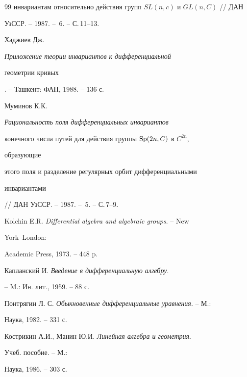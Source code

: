 \begin{thebibliography}{99}
{инвариантам относительно действия групп $SL(n,c)$ и $GL(n,C)$} // ДАН 


УзССР. -- 1987. -- \No\,6. -- С.\,11--13.




Хаджиев Дж. {\em Приложение теории инвариантов к дифференциальной 


геометрии кривых}. -- Ташкент: ФАН, 1988. -- 136 с.




Муминов К.К. {\em Рациональность поля дифференциальных инвариантов 


конечного числа путей для действия группы $\operatorname{Sp}(2n,C)$ в $C^{2n}$, 


образующие 


этого поля и разделение регулярных орбит дифференциальными 


инвариантами} // ДАН УзССР. -- 1987. -- \No\,5. -- С.\,7--9.




Kolchin E.R. {\em Differential algebra and algebraic groups}. -- New 


York--London:


Academic Press, 1973. -- 448 p.




Капланский И. {\em Введение в дифференциальную алгебру}.


-- M.: Ин. лит., 1959. -- 88 с.




Понтрягин Л. С. {\em Обыкновенные дифференциальные уравнения}. -- М.:


Наука, 1982. -- 331 с.




Кострикин А.И., Манин Ю.И. {\em Линейная алгебра и геометрия}.


Учеб. пособие. -- М.:


Наука, 1986. -- 303 с.





\end{thebibliography}





\vskip 2cm












\label{end}








